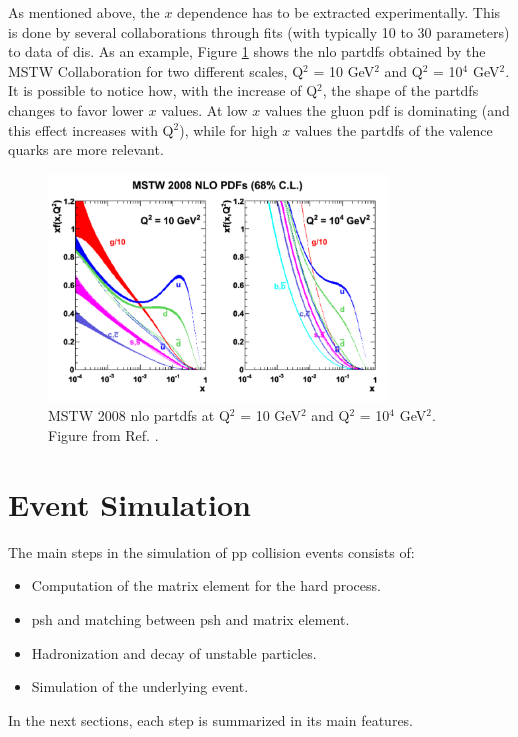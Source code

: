 As mentioned above, the $x$ dependence has to be extracted experimentally. This is done by several collaborations through fits (with typically 10 to 30 parameters) to data of \gls{dis}. As an example, Figure \ref{fig:sim:pp} shows the \gls{nlo} \glspl{partdf} obtained by the MSTW Collaboration for two different scales, Q$^2$ = 10 GeV$^2$ and Q$^2$ = 10$^4$ GeV$^2$. It is possible to notice how, with the increase of Q$^2$, the shape of the \glspl{partdf} changes to favor lower $x$ values. At low $x$ values the gluon \gls{pdf} is dominating (and this effect increases with Q$^2$), while for high $x$ values the \glspl{partdf} of the valence quarks are more relevant.

\begin{figure}[h]
\begin{center}
    \includegraphics[width=0.8\textwidth]{figures/simul/pdf}
\end{center}
\caption{MSTW 2008 \gls{nlo} \glspl{partdf} at Q$^2$ = 10 GeV$^2$ and Q$^2$ = 10$^4$ GeV$^2$. Figure from Ref. \cite{Martin:2009iq}.}
 \label{fig:sim:pp}
\end{figure}


\section{Event Simulation}
\label{sec:eventsimul}

The main steps in the simulation of \gls{pp} collision events consists of:
\begin{itemize}
\item Computation of the matrix element for the hard process.
\item \gls{psh} and matching between \gls{psh} and matrix element.
\item Hadronization and decay of unstable particles.
\item Simulation of the underlying event.
\end{itemize}
In the next sections, each step is summarized in its main features.

